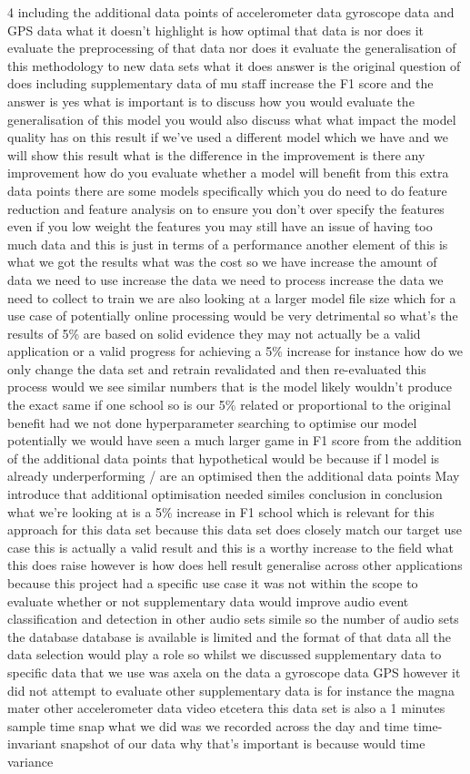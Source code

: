 \documentclass{UoNMCHA}
\numberwithin{equation}{section}
\begin{document}
4 including the additional data points of accelerometer data gyroscope data and GPS data what it doesn't highlight is how optimal that data is nor does it evaluate the preprocessing of that data nor does it evaluate the generalisation of this methodology to new data sets what it does answer is the original question of does including supplementary data of mu staff increase the F1 score and the answer is yes what is important is to discuss how you would evaluate the generalisation of this model you would also discuss what what impact the model quality has on this result if we've used a different model which we have and we will show this result what is the difference in the improvement is there any improvement how do you evaluate whether a model will benefit from this extra data points there are some models specifically which you do need to do feature reduction and feature analysis on to ensure you don't over specify the features even if you low weight the features you may still have an issue of having too much data and this is just in terms of a performance another element of this is what we got the results what was the cost so we have increase the amount of data we need to use increase the data we need to process increase the data we need to collect to train we are also looking at a larger model file size which for a use case of potentially online processing would be very detrimental so what's the results of 5\% are based on solid evidence they may not actually be a valid application or a valid progress for achieving a 5\% increase for instance how do we only change the data set and retrain revalidated and then re-evaluated this process would we see similar numbers that is the model likely wouldn't produce the exact same if one school so is our 5\% related or proportional to the original benefit had we not done hyperparameter searching to optimise our model potentially we would have seen a much larger game in F1 score from the addition of the additional data points that hypothetical would be because if l model is already underperforming / are an optimised then the additional data points May introduce that additional optimisation needed similes conclusion in conclusion what we're looking at is a 5\% increase in F1 school which is relevant for this approach for this data set because this data set does closely match our target use case this is actually a valid result and this is a worthy increase to the field what this does raise however is how does hell result generalise across other applications because this project had a specific use case it was not within the scope to evaluate whether or not supplementary data would improve audio event classification and detection in other audio sets simile so the number of audio sets the database database is available is limited and the format of that data all the data selection would play a role so whilst we discussed supplementary data to specific data that we use was axela on the data a gyroscope data GPS however it did not attempt to evaluate other supplementary data is for instance the magna mater other accelerometer data video etcetera this data set is also a 1 minutes sample time snap what we did was we recorded across the day and time time-invariant snapshot of our data why that's important is because would time variance 
\end{document}
